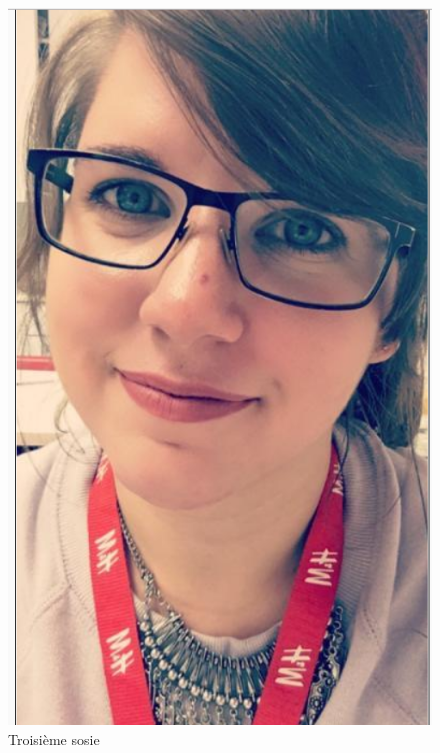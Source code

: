 \documentclass[a4paper,12pt]{article}
\begin{document}
\begin{figure}[!ht]
    \centering
        \includegraphics[scale=0.3]{images/ResS13.PNG}
        \caption{Troisième sosie}
    \end{figure}
    
\end{document}

